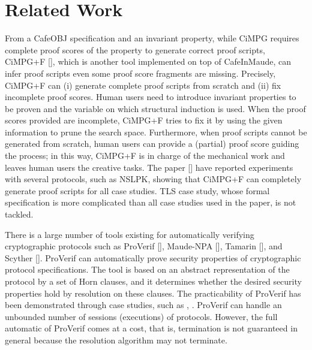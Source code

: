 \documentclass[a4paper,fleqn]{cas-dc}
\begin{document}
\section{Related Work}\label{relatedwork}
From a CafeOBJ specification and an invariant property,
while CiMPG requires complete proof scores of the property to generate correct proof scripts,
CiMPG+F [\cite{Riesco20}], which is another tool implemented on top of CafeInMaude,
can infer proof scripts even some proof score fragments are missing.
Precisely, CiMPG+F can (i) generate complete proof scripts from scratch and (ii) fix incomplete proof scores.
Human users need to introduce invariant properties to be proven and the variable on which structural induction is used.
When the proof scores provided are incomplete, CiMPG+F tries to fix it by using the given information to prune the search space.
Furthermore, when proof scripts cannot be generated from scratch, human users can provide a (partial) proof score guiding the process; in this way, CiMPG+F is in charge of the mechanical work and leaves human users the creative tasks.
The paper [\cite{Riesco20}] have reported experiments with several protocols, such as NSLPK, showing that CiMPG+F can completely generate proof scripts for all case studies.
TLS case study, whose formal specification is more complicated than all case studies used in the paper, is not tackled.


There is a large number of tools existing for automatically verifying cryptographic protocols such as ProVerif [\cite{proverif}], Maude-NPA [\cite{maudenpa}], Tamarin [\cite{tamarin}], and Scyther [\cite{Scyther08}].
ProVerif can automatically prove security properties of cryptographic protocol specifications.
The tool is based on an abstract representation of the protocol by a set of Horn clauses,
and it determines whether the desired security properties hold by resolution on these clauses.
The practicability of ProVerif has been demonstrated through case studies, such as \cite{proverif2}, \cite{proverif3}. 
ProVerif can handle an unbounded number of sessions (executions) of protocols. 
However, the full automatic of ProVerif comes at a cost, that is, termination is not guaranteed in general because the resolution algorithm may not terminate. 
\end{document}
